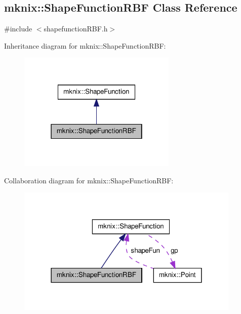 \hypertarget{classmknix_1_1_shape_function_r_b_f}{\subsection{mknix\-:\-:Shape\-Function\-R\-B\-F Class Reference}
\label{classmknix_1_1_shape_function_r_b_f}
}


{\ttfamily \#include $<$shapefunction\-R\-B\-F.\-h$>$}



Inheritance diagram for mknix\-:\-:Shape\-Function\-R\-B\-F\-:\nopagebreak
\begin{figure}[H]
\begin{center}
\leavevmode
\includegraphics[width=214pt]{de/d7f/classmknix_1_1_shape_function_r_b_f__inherit__graph}
\end{center}
\end{figure}


Collaboration diagram for mknix\-:\-:Shape\-Function\-R\-B\-F\-:\nopagebreak
\begin{figure}[H]
\begin{center}
\leavevmode
\includegraphics[width=302pt]{de/d76/classmknix_1_1_shape_function_r_b_f__coll__graph}
\end{center}
\end{figure}
